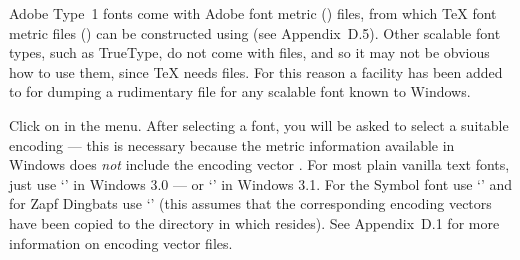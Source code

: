
Adobe Type~1 fonts come with Adobe font metric ({\AFM}) files, from
which {\TeX} font metric files ({\TFM}) can be constructed
using {\AFMTOTFM} (see Appendix~D.5). %
Other scalable font types, such as True\-Type, do not come with {\AFM} files,
and so it may not be obvious how to use them, since {\TeX} needs {\TFM} files.
For this reason a facility has been added to {\DVIWindo} for dumping a
rudimentary {\AFM} file for any scalable font known to Windows.

Click on  in the  %
menu.
After selecting a font, you will be asked to select a suitable encoding
--- this is necessary because the metric information available in Windows
does {\it not\/} include the encoding vector%
.
For most plain vanilla text fonts, just use `' in
Windows 3.0 --- or `' in Windows 3.1.
For the Symbol font use `' and for Zapf Dingbats use
`' (this assumes that the corresponding encoding vectors have
been copied to the directory in which {\DVIWindo} resides).
See Appendix~D.1 for more information on encoding vector files.



